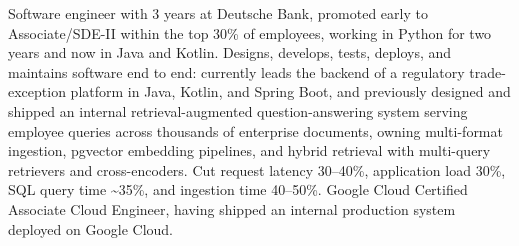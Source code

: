 \documentclass[11pt,a4paper,sans]{moderncv}
\begin{document}
\makecvtitle


\vspace{6pt}
\small{Software engineer with 3 years at Deutsche Bank, promoted early to Associate/SDE-II within the top 30\% of employees, working in Python for two years and now in Java and Kotlin. Designs, develops, tests, deploys, and maintains software end to end: currently leads the backend of a regulatory trade-exception platform in Java, Kotlin, and Spring Boot, and previously designed and shipped an internal retrieval-augmented question-answering system serving employee queries across thousands of enterprise documents, owning multi-format ingestion, pgvector embedding pipelines, and hybrid retrieval with multi-query retrievers and cross-encoders. Cut request latency 30--40\%, application load 30\%, SQL query time \textasciitilde35\%, and ingestion time 40--50\%. Google Cloud Certified Associate Cloud Engineer, having shipped an internal production system deployed on Google Cloud.}

\end{document}
